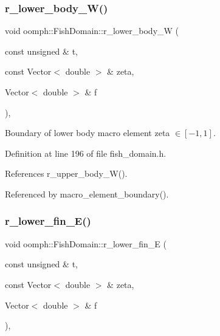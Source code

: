 \subsubsection{\texorpdfstring{r\+\_\+lower\+\_\+body\+\_\+\+W()}{r\_lower\_body\_W()}}
{\footnotesize\ttfamily void oomph\+::\+Fish\+Domain\+::r\+\_\+lower\+\_\+body\+\_\+W (\begin{DoxyParamCaption}\item[{const unsigned \&}]{t,  }\item[{const Vector$<$ double $>$ \&}]{zeta,  }\item[{Vector$<$ double $>$ \&}]{f }\end{DoxyParamCaption})\hspace{0.3cm}{\ttfamily [inline]}, {\ttfamily [private]}}



Boundary of lower body macro element zeta $ \in [-1,1] $. 



Definition at line 196 of file fish\+\_\+domain.\+h.



References r\+\_\+upper\+\_\+body\+\_\+\+W().



Referenced by macro\+\_\+element\+\_\+boundary().

\mbox{\label{classoomph_1_1FishDomain_a956dcbb87e9b37a0b965fcddb9911de3}} 
\subsubsection{\texorpdfstring{r\+\_\+lower\+\_\+fin\+\_\+\+E()}{r\_lower\_fin\_E()}}
{\footnotesize\ttfamily void oomph\+::\+Fish\+Domain\+::r\+\_\+lower\+\_\+fin\+\_\+E (\begin{DoxyParamCaption}\item[{const unsigned \&}]{t,  }\item[{const Vector$<$ double $>$ \&}]{zeta,  }\item[{Vector$<$ double $>$ \&}]{f }\end{DoxyParamCaption})\hspace{0.3cm}{\ttfamily [inline]}, {\ttfamily [private]}}



